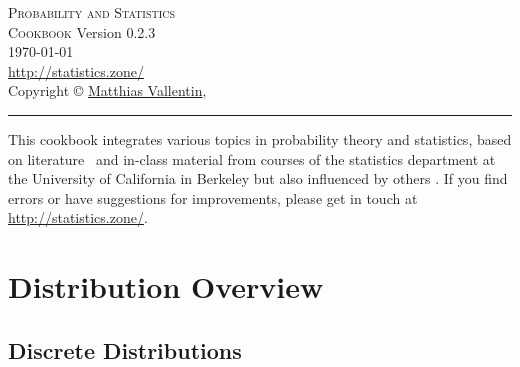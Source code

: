 \documentclass[landscape]{article}
\newcommand{\version}{0.2.3}
\def\web{\url{http://statistics.zone/}}
\begin{document}
\thispagestyle{empty}
\begin{center}
  \vspace*{\fill}
  \textsc{\Huge Probability and Statistics\\[2ex] \huge Cookbook}
  \vfill
  \footnotesize{
    Version \version\\[1ex]
    \today\\[1ex]
    \web\\[1ex]
    Copyright \copyright{}
    \href{http://matthias.vallentin.net}{Matthias Vallentin}, \number\year\\
  }
\end{center}

\newpage

\thispagestyle{empty}
\begin{multicols*}{3}
  \tableofcontents
  \vfill
  \hrule
  \vspace{5pt}
  {\footnotesize This cookbook integrates various topics in probability theory
  and statistics, based on literature~\cite{Hoel72,Wasserman03,Shumway06}
  and in-class material from courses of the statistics department at the
  University of California in Berkeley but also influenced by others
  \cite{Steger01,Steger02}. If you find errors or have suggestions for
  improvements, please get in touch at \web.}
\end{multicols*}

\newpage

\section{Distribution Overview}

\subsection{Discrete Distributions}
\end{document}

